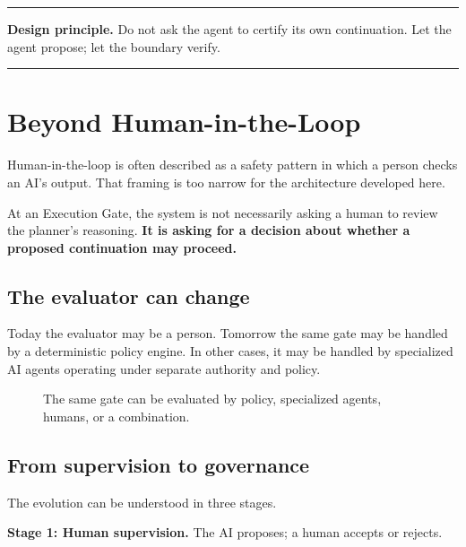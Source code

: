 \documentclass[10pt,oneside,openany]{book}
\newcommand{\principle}[1]{%
  \vspace{4pt}
  \noindent\begin{minipage}{\linewidth}
  \hrule\vspace{5pt}
  \small\sffamily\raggedright\textbf{Design principle.} #1
  \vspace{5pt}\hrule
  \end{minipage}\vspace{4pt}
}
\begin{document}
\principle{Do not ask the agent to certify its own continuation. Let the agent propose; let the boundary verify.}

\chapter{Beyond Human-in-the-Loop}

Human-in-the-loop is often described as a safety pattern in which a person checks an AI's output. That framing is too narrow for the architecture developed here.

At an Execution Gate, the system is not necessarily asking a human to review the planner's reasoning. \textbf{It is asking for a decision about whether a proposed continuation may proceed.}

\section{The evaluator can change}
Today the evaluator may be a person. Tomorrow the same gate may be handled by a deterministic policy engine. In other cases, it may be handled by specialized AI agents operating under separate authority and policy.

\begin{figure}[ht]
\centering
{}
\caption{The same gate can be evaluated by policy, specialized agents, humans, or a combination.}
\end{figure}

\section{From supervision to governance}
The evolution can be understood in three stages.

\textbf{Stage 1: Human supervision.} The AI proposes; a human accepts or rejects.
\end{document}
